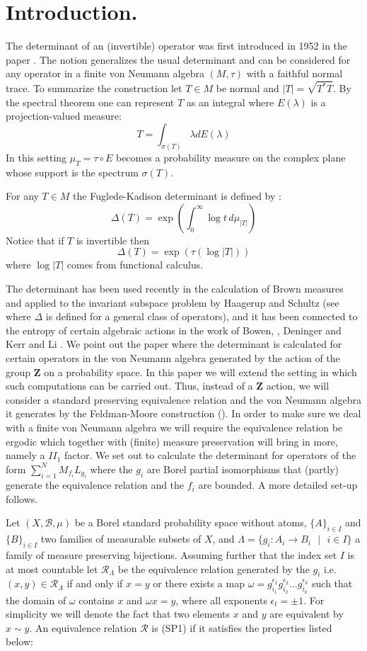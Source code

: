 \documentclass[12pt]{amsart}
\numberwithin{equation}{section}
\begin{document}
\section{Introduction.}
\par The determinant of an (invertible) operator was first introduced in 1952 in the paper \cite{FK}. The notion generalizes the usual determinant and can be considered for any operator in a finite von Neumann algebra $(M,\tau)$ with a faithful normal trace. To summarize the construction let
$T\in M$ be normal and $|T|=\sqrt{T^*T}$. By the spectral theorem one can represent $T$ as an integral where $E(\lambda)$ is a projection-valued measure:
$$T=\int_{\sigma(T)}\lambda dE(\lambda)$$
In this setting $\mu_T=\tau\circ E$ becomes a probability measure on the complex plane whose support is the spectrum $\sigma(T)$.
\par For any $T\in M$ the Fuglede-Kadison determinant is defined by :
$$\Delta(T)=\exp\left(\int_{0}^{\infty}\log t \,d\mu_{|T|}\right)$$
Notice that if $T$ is invertible then
$$\Delta(T)=\exp(\tau(\log|T|))$$
where $\log|T|$ comes from functional calculus.
\par The determinant has been used recently in the calculation of Brown measures and applied to the invariant subspace problem by Haagerup and Schultz (see \cite{HSc} where $\Delta$ is defined for a general class of operators), and it has been connected to the entropy of certain algebraic actions in the work of Bowen, \cite{ Bow}, Deninger \cite{Den2} and Kerr and Li \cite{KLi}. We point out the paper \cite{Den1} where the determinant is calculated for certain operators in the von Neumann algebra generated by the action of the group $\mathbf{Z}$ on a probability space. In this paper we will extend the setting in which such computations can be carried out. Thus,  instead of a $\mathbf{Z}$ action, we will consider a standard preserving equivalence relation and the von Neumann algebra it generates by the Feldman-Moore construction (\cite{FMII}). In order to make sure we deal with a finite von Neumann algebra we will require the equivalence relation be ergodic which together with (finite) measure preservation will bring in more, namely a $II_1$ factor. We set out to calculate the determinant for  operators of the form $\sum_{i=1}^N M_{f_i}L_{g_i}$ where the $g_i$ are Borel partial isomorphisms that (partly) generate the equivalence relation and the $f_i$ are bounded. A more detailed set-up follows.
\par Let $(X,\mathcal{B}, \mu)$ be a Borel standard probability space without atoms, $\{A\}_{i \in I}$ and $\{B\}_{i \in I}$ two families of measurable subsets of $X$, and $\Lambda=\{g_i:A_i \to B_i\mbox{ }|\mbox{ }i\in I\}$ a family of measure preserving bijections. Assuming further that the index set $I$ is at most countable let $\mathcal{R}_{\Lambda}$ be the equivalence relation generated by the $g_i$  i.e. $(x,y)\in\mathcal{R}_{\Lambda}$ if and only if $x=y$ or there exists a map $\omega=g_{i_1}^{\epsilon_1}g_{i_2}^{\epsilon_2}\dots g_{i_k}^{\epsilon_k}$  such that the domain of $\omega$ contains $x$ and $\omega x=y$, where all exponents $\epsilon_{t}=\pm 1$. For simplicity we will denote the fact that two elements $x$ and $y$ are equivalent by $x\sim y$. An equivalence relation $\mathcal{R}$ is (SP1) if it  satisfies the properties listed below:
\end{document}
